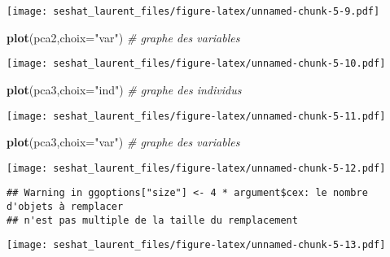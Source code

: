 \documentclass[
]{article}
\newenvironment{Shaded}{\begin{snugshade}}{\end{snugshade}}
\newcommand{\CommentTok}[1]{\textcolor[rgb]{0.56,0.35,0.01}{\textit{#1}}}
\newcommand{\DataTypeTok}[1]{\textcolor[rgb]{0.13,0.29,0.53}{#1}}
\newcommand{\KeywordTok}[1]{\textcolor[rgb]{0.13,0.29,0.53}{\textbf{#1}}}
\newcommand{\NormalTok}[1]{#1}
\newcommand{\OperatorTok}[1]{\textcolor[rgb]{0.81,0.36,0.00}{\textbf{#1}}}
\newcommand{\StringTok}[1]{\textcolor[rgb]{0.31,0.60,0.02}{#1}}
\begin{document}
\texttt{[image: seshat\_laurent\_files/figure-latex/unnamed-chunk-5-9.pdf]}

\begin{Shaded}
\begin{Highlighting}[]
\KeywordTok{plot}\NormalTok{(pca2,}\DataTypeTok{choix=}\StringTok{"var"}\NormalTok{)    }\CommentTok{# graphe des variables }
\end{Highlighting}
\end{Shaded}

\texttt{[image: seshat\_laurent\_files/figure-latex/unnamed-chunk-5-10.pdf]}

\begin{Shaded}
\begin{Highlighting}[]
\KeywordTok{plot}\NormalTok{(pca3,}\DataTypeTok{choix=}\StringTok{"ind"}\NormalTok{)    }\CommentTok{# graphe des individus}
\end{Highlighting}
\end{Shaded}

\texttt{[image: seshat\_laurent\_files/figure-latex/unnamed-chunk-5-11.pdf]}

\begin{Shaded}
\begin{Highlighting}[]
\KeywordTok{plot}\NormalTok{(pca3,}\DataTypeTok{choix=}\StringTok{"var"}\NormalTok{)    }\CommentTok{# graphe des variables }
\end{Highlighting}
\end{Shaded}

\texttt{[image: seshat\_laurent\_files/figure-latex/unnamed-chunk-5-12.pdf]}

\begin{Shaded}
\end{Shaded}

\begin{verbatim}
## Warning in ggoptions["size"] <- 4 * argument$cex: le nombre d'objets à remplacer
## n'est pas multiple de la taille du remplacement
\end{verbatim}

\texttt{[image: seshat\_laurent\_files/figure-latex/unnamed-chunk-5-13.pdf]}

\begin{Shaded}
\end{Shaded}
\end{document}
